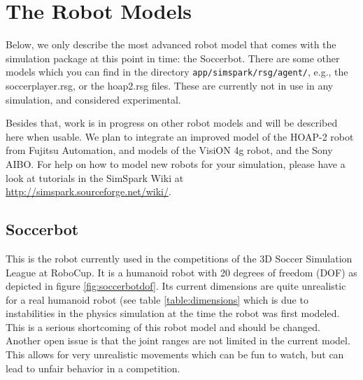 \chapter{The Robot Models}
\label{cha:robots}


Below, we only describe the most advanced robot model that comes with the simulation package at this point in time: the Soccerbot. There are some other models which you can find in the directory \texttt{app/simspark/rsg/agent/}, e.g., the soccerplayer.rsg, or the hoap2.rsg files. These are currently not in use in any simulation, and considered experimental.

Besides that, work is in progress on other robot models and will be described here when usable. We plan to integrate an improved model of the HOAP-2 robot from Fujitsu Automation, and models of the VisiON 4g robot, and the Sony AIBO. For help on how to model new robots for your simulation, please have a look at tutorials in the SimSpark Wiki at \\

\url{http://simspark.sourceforge.net/wiki/}.

\section{Soccerbot}

This is the robot currently used in the competitions of the 3D Soccer Simulation League at RoboCup. It is a humanoid robot with 20 degrees of freedom (DOF) as depicted in figure \ref{fig:soccerbotdof}. Its current dimensions are quite unrealistic for a real humanoid robot (see table \ref{table:dimensions} which is due to instabilities in the physics simulation at the time the robot was first modeled. This is a serious shortcoming of this robot model and should be changed. Another open issue is that the joint ranges are not limited in the current model. This allows for very unrealistic movements which can be fun to watch, but can lead to unfair behavior in a competition.

